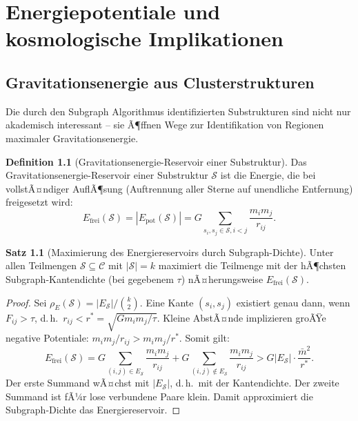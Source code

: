﻿\documentclass[a4paper,12pt]{report}
\theoremstyle{definition}
\newtheorem{definition}{Definition}
\newtheorem{satz}{Satz}
\begin{document}
\chapter{Energiepotentiale und kosmologische Implikationen}

\section{Gravitationsenergie aus Clusterstrukturen}

Die durch den Subgraph Algorithmus identifizierten Substrukturen sind nicht nur akademisch interessant -- sie Ã¶ffnen Wege zur Identifikation von Regionen maximaler Gravitationsenergie.

\begin{definition}[Gravitationsenergie-Reservoir einer Substruktur]
Das Gravitationsenergie-Reservoir einer Substruktur $\mathcal{S}$ ist die Energie, die bei vollstÃ¤ndiger AuflÃ¶sung (Auftrennung aller Sterne auf unendliche Entfernung) freigesetzt wird:
\[
E_\mathrm{frei}(\mathcal{S}) = |E_\mathrm{pot}(\mathcal{S})| = G \sum_{s_i, s_j \in \mathcal{S}, i < j} \frac{m_i m_j}{r_{ij}}.
\]
\end{definition}

\begin{satz}[Maximierung des Energiereservoirs durch Subgraph-Dichte]
\label{satz:energiereservoir}
Unter allen Teilmengen $\mathcal{S} \subseteq \mathcal{C}$ mit $|\mathcal{S}| = k$ maximiert die Teilmenge mit der hÃ¶chsten Subgraph-Kantendichte (bei gegebenem $\tau$) nÃ¤herungsweise $E_\mathrm{frei}(\mathcal{S})$.
\end{satz}

\begin{proof}
Sei $\rho_E(\mathcal{S}) = |E_\mathcal{S}| / \binom{k}{2}$. Eine Kante $(s_i, s_j)$ existiert genau dann, wenn $F_{ij} > \tau$, d.\,h.\ $r_{ij} < r^* = \sqrt{G m_i m_j / \tau}$. Kleine AbstÃ¤nde implizieren groÃŸe negative Potentiale: $m_i m_j / r_{ij} > m_i m_j / r^*$. Somit gilt:
\[
E_\mathrm{frei}(\mathcal{S}) = G \sum_{(i,j) \in E_\mathcal{S}} \frac{m_i m_j}{r_{ij}} + G \sum_{(i,j) \notin E_\mathcal{S}} \frac{m_i m_j}{r_{ij}} > G |E_\mathcal{S}| \cdot \frac{\bar{m}^2}{r^*}.
\]
Der erste Summand wÃ¤chst mit $|E_\mathcal{S}|$, d.\,h.\ mit der Kantendichte. Der zweite Summand ist fÃ¼r lose verbundene Paare klein. Damit approximiert die Subgraph-Dichte das Energiereservoir.
\end{proof}
\end{document}
